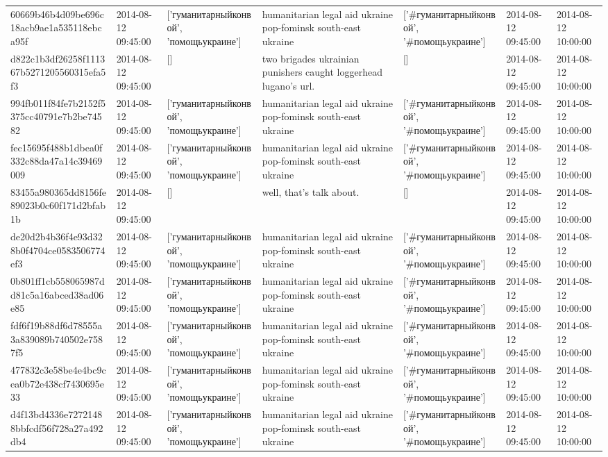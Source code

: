 \begin{tabular}{lllllll}
60669b46b4d09be696c18acb9ae1a535118ebca95f & 2014-08-12 09:45:00 & ['гуманитарныйконвой', 'помощьукраине'] & humanitarian legal aid ukraine pop-fominsk south-east ukraine & ['#гуманитарныйконвой', '#помощьукраине'] & 2014-08-12 09:45:00 & 2014-08-12 10:00:00 \\
d822c1b3df26258f111367b5271205560315efa5f3 & 2014-08-12 09:45:00 & [] & two brigades ukrainian punishers caught loggerhead lugano's url. & [] & 2014-08-12 09:45:00 & 2014-08-12 10:00:00 \\
994fb011f84fe7b2152f5375cc40791e7b2be74582 & 2014-08-12 09:45:00 & ['гуманитарныйконвой', 'помощьукраине'] & humanitarian legal aid ukraine pop-fominsk south-east ukraine & ['#гуманитарныйконвой', '#помощьукраине'] & 2014-08-12 09:45:00 & 2014-08-12 10:00:00 \\
fec15695f488b1dbea0f332c88da47a14c39469009 & 2014-08-12 09:45:00 & ['гуманитарныйконвой', 'помощьукраине'] & humanitarian legal aid ukraine pop-fominsk south-east ukraine & ['#гуманитарныйконвой', '#помощьукраине'] & 2014-08-12 09:45:00 & 2014-08-12 10:00:00 \\
83455a980365dd8156fe89023b0c60f171d2bfab1b & 2014-08-12 09:45:00 & [] & well, that's talk about. & [] & 2014-08-12 09:45:00 & 2014-08-12 10:00:00 \\
de20d2b4b36f4e93d328b0f4704ce0583506774ef3 & 2014-08-12 09:45:00 & ['гуманитарныйконвой', 'помощьукраине'] & humanitarian legal aid ukraine pop-fominsk south-east ukraine & ['#гуманитарныйконвой', '#помощьукраине'] & 2014-08-12 09:45:00 & 2014-08-12 10:00:00 \\
0b801ff1cb558065987dd81c5a16abced38ad06e85 & 2014-08-12 09:45:00 & ['гуманитарныйконвой', 'помощьукраине'] & humanitarian legal aid ukraine pop-fominsk south-east ukraine & ['#гуманитарныйконвой', '#помощьукраине'] & 2014-08-12 09:45:00 & 2014-08-12 10:00:00 \\
fdf6f19b88df6d78555a3a839089b740502e7587f5 & 2014-08-12 09:45:00 & ['гуманитарныйконвой', 'помощьукраине'] & humanitarian legal aid ukraine pop-fominsk south-east ukraine & ['#гуманитарныйконвой', '#помощьукраине'] & 2014-08-12 09:45:00 & 2014-08-12 10:00:00 \\
477832c3e58be4e4bc9cea0b72e438cf7430695e33 & 2014-08-12 09:45:00 & ['гуманитарныйконвой', 'помощьукраине'] & humanitarian legal aid ukraine pop-fominsk south-east ukraine & ['#гуманитарныйконвой', '#помощьукраине'] & 2014-08-12 09:45:00 & 2014-08-12 10:00:00 \\
d4f13bd4336e72721488bbfcdf56f728a27a492db4 & 2014-08-12 09:45:00 & ['гуманитарныйконвой', 'помощьукраине'] & humanitarian legal aid ukraine pop-fominsk south-east ukraine & ['#гуманитарныйконвой', '#помощьукраине'] & 2014-08-12 09:45:00 & 2014-08-12 10:00:00 \\

\end{tabular}
